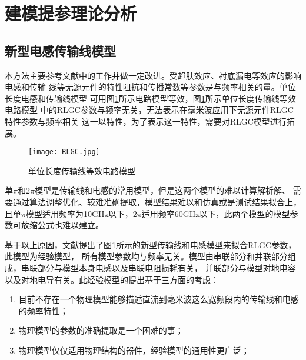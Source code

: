 \section{建模提参理论分析}
\subsection{新型电感传输线模型}
本方法主要参考文献\cite{brinkhoff2008scalable}中的工作并做一定改进。受趋肤效应、衬底漏电等效应的影响电感和传输
线等无源元件的特性阻抗和传播常数等参数是与频率相关的量。单位长度电感和传输线模型
可用图\ref{fig:RLGC}所示电路模型等效，图\ref{fig:RLGC}所示单位长度传输线等效电路模型
中的RLGC参数与频率无关，无法表示在毫米波应用下无源元件RLGC特性参数与频率相关
这一以特性，为了表示这一特性，需要对RLGC模型进行拓展。
\begin{figure}[t]
  \centering
  \texttt{[image: RLGC.jpg]}
  \caption{单位长度传输线等效电路模型}\label{fig:RLGC}
\end{figure}
\par
单$\pi$和$2\pi$模型是传输线和电感的常用模型，但是这两个模型的难以计算解析解、
需要通过算法调整优化、较难准确提取，模型结果难以和仿真或是测试结果拟合上，
且单$\pi$模型适用频率为10GHz以下\cite{yue1998chip}，$2\pi$适用频率60GHz以下\cite{dickson200530}，此两个模型的模型参数可放缩公式也难以建立。
\par
基于以上原因，文献\cite{brinkhoff2008scalable}提出了图\ref{fig:RLGC}所示的新型传输线和电感模型来拟合RLGC参数，此模型为经验模型，
所有模型参数均与频率无关。模型由串联部分和并联部分组成，串联部分与模型本身电感以及串联电阻损耗有关，
并联部分与模型对地电容以及对地电导有关。此经验模型的提出基于三方面的考虑：

\begin{enumerate}[itemsep=1pt, topsep=12pt, partopsep=0pt,label={(\arabic*)}] %
  \item 目前不存在一个物理模型能够描述直流到毫米波这么宽频段内的传输线和电感的频率特性；
  \item 物理模型的参数的准确提取是一个困难的事；
  \item 物理模型仅仅适用物理结构的器件，经验模型的通用性更广泛；
\end{enumerate}

